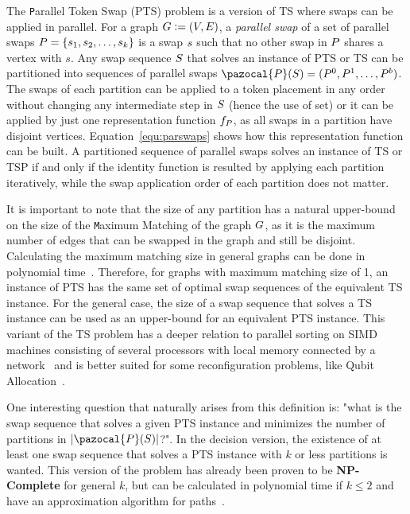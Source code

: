 \documentclass[msc,english,table,xcdraw]{ppgccufmg}
\begin{document}
The {\texttt Parallel Token Swap} (PTS) problem is a version of TS where swaps can 
be applied in parallel.
For a graph $G \vcentcolon= (V, E)$, a \textit{parallel swap} of 
a set of parallel swaps $P = \{s_1, s_2, \ldots, 
s_k\}$ is a swap $s$ such that no other swap in $P$ shares a 
vertex with $s$.
Any swap sequence $S$ that solves an instance of PTS or TS can be 
partitioned into sequences of parallel swaps $\applyFunc{\pazocal{\swapPSeq}}{S} 
= (\swapPSeq^{0}, \swapPSeq^{1}, \ldots, \swapPSeq^{b})$.
The swaps of each partition can be applied to a token placement in any order 
without changing any intermediate step in $S$ (hence the use of set) or 
it can be applied by just one representation function $f_{P}$, as 
all swaps in a partition have disjoint vertices.
Equation~\ref{equ:parswaps} shows how this representation function can be built.
A partitioned sequence of parallel swaps solves an instance of TS or TSP if and 
only if the identity function is resulted by applying each partition 
iteratively, while the swap application order of each partition does not matter.


It is important to note that the size of any partition has a natural upper-bound 
on the size of the {\texttt Maximum Matching} of the graph $G$, as it is the
maximum number of edges that can be swapped in the graph and still be disjoint.
Calculating the maximum matching size in general graphs can be done in 
polynomial time~\citep{Edmonds:1965}.
Therefore, for graphs with maximum matching size of 1, an instance of PTS has the
same set of optimal swap sequences of the equivalent TS instance.
For the general case, the size of a swap sequence that solves a TS instance can be
used as an upper-bound for an equivalent PTS instance.
This variant of the TS problem has a deeper relation to parallel sorting on SIMD
machines consisting of several processors with local memory connected by a 
network~\citep{Yamanaka:2015,Kawahara:2017} and is better suited for some 
reconfiguration problems, like Qubit Allocation~\citep
{Siraichi:2018,Siraichi:2019}.

One interesting question that naturally arises from this definition is: "what 
is the swap sequence that solves a given PTS instance and minimizes the number 
of partitions in $\sizeof{\applyFunc{\pazocal{\swapPSeq}}{\swapSeq}}$?".
In the decision version, the existence of at least one swap sequence that solves 
a PTS instance with $k$ or less partitions is wanted.
This version of the problem has already been proven to be \textbf{NP-Complete}
for general $k$, but can be calculated in polynomial time if $k \leq 2$ and
have an approximation algorithm for paths~\citep{Kawahara:2017}.
\end{document}
